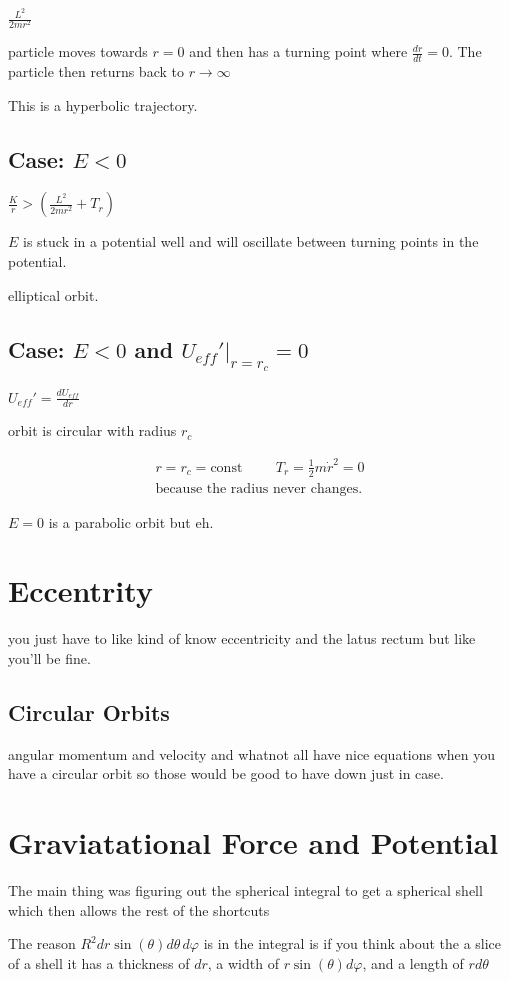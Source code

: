 \documentclass[fleqn]{article}
\newcommand{\hp}{\hspace{1cm}}
\newcommand{\const}{\textrm{const}}
\newcommand{\equations} [1] {
\begin{gather*}
#1
\end{gather*}
}
\begin{document}
$\frac{L^2}{2 m r^2}$

particle moves towards $r = 0$ and then has a turning point where $\frac{dr}{dt} = 0$. The particle then returns back to $r \to \infty$

This is a hyperbolic trajectory. 


\subsection{Case: $E < 0$}
$\frac{K}{r} > (\frac{L^2}{2 m r^2} + T_r)$

$E$ is stuck in a potential well and will oscillate between turning points in the potential. 

elliptical orbit. 

\subsection{Case: $E < 0$ and $U_{eff}' \Big|_{r = r_c} = 0$}
$U_{eff}' = \frac{dU_{eff}}{dr}$

orbit is circular with radius $r_c$

\equations{
    r = r_c = \const \hp 
    T_r = \frac{1}{2} m \dot r^2 = 0
    \\
    \textrm{because the radius never changes.}
}

$E = 0$ is a parabolic orbit but eh.

\section{Eccentrity}
you just have to like kind of know eccentricity and the latus rectum but like you'll be fine. 

\subsection{Circular Orbits}
angular momentum and velocity and whatnot all have nice equations when you have a circular orbit so those would be good to have down just in case. 


\section{Graviatational Force and Potential}
The main thing was figuring out the spherical integral to get a spherical shell which then allows the rest of the shortcuts 

The reason $R^2 dr \sin(\theta) d \theta \, d\varphi$ is in the integral is if you think about the a slice of a shell it has a thickness of $dr$, a width of $r \sin(\theta) d \varphi$, and a length of $r d \theta$
\end{document}
